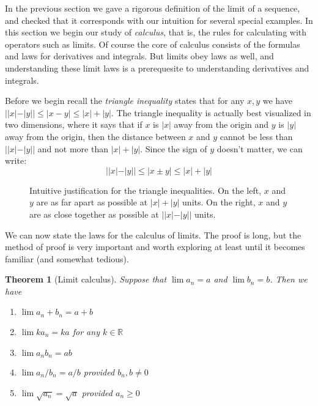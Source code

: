 \documentclass[11pt,oneside]{amsbook}
\newcommand{\R}{\mathbb R}
\theoremstyle{definition}
\theoremstyle{plain}
\newtheorem{theorem}{Theorem}[section]
\theoremstyle{definition}
\theoremstyle{remark}
\numberwithin{equation}{section}
\numberwithin{figure}{section}
\begin{document}
In the previous section we gave a rigorous definition of the limit of a sequence, and checked that it corresponds with our intuition for several special examples. In this section we begin our study of \emph{calculus}, that is, the rules for calculating with operators such as limits. Of course the core of calculus consists of the formulas and laws for derivatives and integrals. But limits obey laws as well, and understanding these limit laws is a prerequesite to understanding derivatives and integrals.

Before we begin recall the \emph{triangle inequality} states that for any $x,y$ we have $||x|-|y||\leq|x-y|\leq|x|+|y|$. The triangle inequality is actually best visualized in two dimensions, where it says that if $x$ is $|x|$ away from the origin and $y$ is $|y|$ away from the origin, then the distance between $x$ and $y$ cannot be less than $||x|-|y||$ and not more than $|x|+|y|$. Since the sign of $y$ doesn't matter, we can write:
\[||x|-|y||\leq|x\pm y|\leq|x|+|y|
\]

\begin{figure}[h]
  \centering
  \quad
  \caption{Intuitive justification for the triangle inequalities. On the left, $x$ and $y$ are as far apart as possible at $|x|+|y|$ units. On the right, $x$ and $y$ are as close together as possible at $||x|-|y||$ units.}
\end{figure}

We can now state the laws for the calculus of limits. The proof is long, but the method of proof is very important and worth exploring at least until it becomes familiar (and somewhat tedious).

\begin{theorem}[Limit calculus]
  Suppose that $\lim a_n=a$ and $\lim b_n=b$. Then we have
  \begin{enumerate}
    \item $\lim a_n+b_n=a+b$
    \item $\lim ka_n=ka$ for any $k\in\R$
    \item $\lim a_nb_n=ab$
    \item $\lim a_n/b_n=a/b$ provided $b_n,b\neq 0$
    \item $\lim \sqrt{a_n}=\sqrt{a}$ provided $a_n\geq0$
  \end{enumerate}
\end{theorem}
\end{document}
